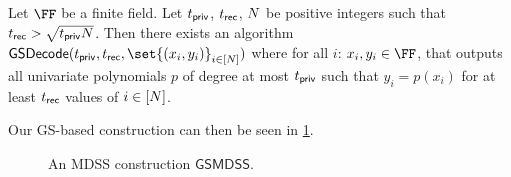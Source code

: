 \begin{theorem}
	\label{thm:GS}
	Let $\FF$ be a finite field.
	Let $t_{\mathsf{priv}}$, $t_{\mathsf{rec}}$, $N$ be positive integers such that $t_{\mathsf{rec}} > \sqrt{t_{\mathsf{priv}}N}$.
	Then there exists an algorithm $\gsDecode(\allowbreak\mdssPrivThr,\allowbreak \mdssRecThr,\allowbreak \set{(x_i, y_i)}_{i\in[\mdssWindowSize]})$ where for all $i$: $x_i, y_i \in \FF$, that outputs all univariate polynomials $p$ of degree at most $t_{\mathsf{priv}}$ such that $y_i = p(x_i)$ for at least $t_{\mathsf{rec}}$ values of $i \in [N]$.
\end{theorem}

Our GS-based construction can then be seen in \cref{fig:gs-mdss}.
\begin{figure}
	\begin{pcvstack}[boxed, center, space=1em]

	\end{pcvstack}
	\caption{An MDSS construction $\mathsf{GSMDSS}$.}
	\label{fig:gs-mdss}
\end{figure}
